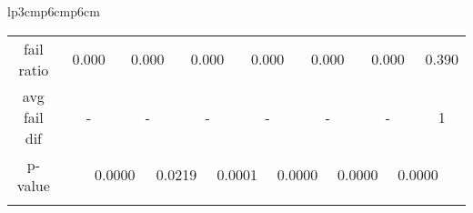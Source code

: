 {\begin{tabular}{lp{3cm}p{6cm}p{6cm}}
\begin{tabular}[h]{m{2.5cm}m{}m{}m{}m{}m{}m{}m{}m{}m{}m{}m{}m{}m{}m{}}
\hline
\multicolumn{1}{c}{fail ratio}&\multicolumn{2}{c}{           0.000}&\multicolumn{2}{c}{     0.000}&\multicolumn{2}{c}{     0.000}&\multicolumn{2}{c}{     0.000}&\multicolumn{2}{c}{     0.000}&\multicolumn{2}{c}{     0.000}&\multicolumn{2}{c}{     0.390}\\
\multicolumn{1}{c}{avg fail dif}&\multicolumn{2}{c}{             -}&\multicolumn{2}{c}{         -}&\multicolumn{2}{c}{         -}&\multicolumn{2}{c}{         -}&\multicolumn{2}{c}{         -}&\multicolumn{2}{c}{         -}&\multicolumn{2}{c}{         1}\\
\hline
\multicolumn{1}{c}{p-value}&&\multicolumn{2}{c}{0.0000}&\multicolumn{2}{c}{0.0219}&\multicolumn{2}{c}{0.0001}&\multicolumn{2}{c}{0.0000}&\multicolumn{2}{c}{0.0000}&\multicolumn{2}{c}{0.0000}\\
&&&&&&&&&&&&&&\end{tabular}
\end{tabular}
}
